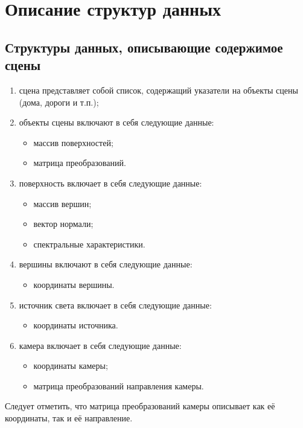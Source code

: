 \section{Описание структур данных}

\subsection*{Структуры данных, описывающие содержимое сцены}

\begin{enumerate}
    \item сцена представляет собой список, содержащий указатели на объекты сцены (дома, дороги и т.п.);
    \item объекты сцены включают в себя следующие данные:\begin{itemize}
        \item массив поверхностей;
        \item матрица преобразований.
    \end{itemize}
    \item поверхность включает в себя следующие данные: \begin{itemize}
        \item массив вершин;
        \item вектор нормали;
        \item спектральные характеристики.
    \end{itemize}
    \item вершины включают в себя следующие данные: \begin{itemize}
        \item координаты вершины.
    \end{itemize}
    \item источник света включает в себя следующие данные: \begin{itemize}
        \item координаты источника.
    \end{itemize}
    \item камера включает в себя следующие данные: \begin{itemize}
        \item координаты камеры; 
        \item матрица преобразований направления камеры.
    \end{itemize}
\end{enumerate}

Следует отметить, что матрица преобразований камеры описывает как её координаты, так и её направление. 


